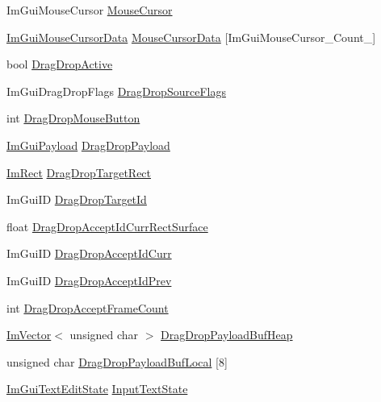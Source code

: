 \begin{DoxyCompactItemize}
Im\+Gui\+Mouse\+Cursor \hyperlink{struct_im_gui_context_ab60730c7f9f601fd0b22dac060a822e3}{Mouse\+Cursor}
\item 
\hyperlink{struct_im_gui_mouse_cursor_data}{Im\+Gui\+Mouse\+Cursor\+Data} \hyperlink{struct_im_gui_context_a244c1b68fdb7da04de90d5becd5a5777}{Mouse\+Cursor\+Data} \mbox{[}Im\+Gui\+Mouse\+Cursor\+\_\+\+Count\+\_\+\mbox{]}
\item 
bool \hyperlink{struct_im_gui_context_a2de4fe755e10ccfee6b06aa84b3d9c0d}{Drag\+Drop\+Active}
\item 
Im\+Gui\+Drag\+Drop\+Flags \hyperlink{struct_im_gui_context_a61d6d8dbd670e2f4e70d50248caac012}{Drag\+Drop\+Source\+Flags}
\item 
int \hyperlink{struct_im_gui_context_a0efbd88ee7334cb922fccb1487ba496c}{Drag\+Drop\+Mouse\+Button}
\item 
\hyperlink{struct_im_gui_payload}{Im\+Gui\+Payload} \hyperlink{struct_im_gui_context_a35f39762769e30c083758c21fbde3e78}{Drag\+Drop\+Payload}
\item 
\hyperlink{struct_im_rect}{Im\+Rect} \hyperlink{struct_im_gui_context_a9c0b11750492d186c9b96b75d824e91b}{Drag\+Drop\+Target\+Rect}
\item 
Im\+Gui\+ID \hyperlink{struct_im_gui_context_af8641ca16b62736c6af16364e65666ab}{Drag\+Drop\+Target\+Id}
\item 
float \hyperlink{struct_im_gui_context_a4a3aa38a5b88e2be8fd73b29e39e3fbc}{Drag\+Drop\+Accept\+Id\+Curr\+Rect\+Surface}
\item 
Im\+Gui\+ID \hyperlink{struct_im_gui_context_af0ac51e2f6bd98443fe5f135f3e2ecac}{Drag\+Drop\+Accept\+Id\+Curr}
\item 
Im\+Gui\+ID \hyperlink{struct_im_gui_context_ab835f6cb1536a4e91b6d589a100612f9}{Drag\+Drop\+Accept\+Id\+Prev}
\item 
int \hyperlink{struct_im_gui_context_a8163ed15c1f157390a3215dcb28feb9e}{Drag\+Drop\+Accept\+Frame\+Count}
\item 
\hyperlink{class_im_vector}{Im\+Vector}$<$ unsigned char $>$ \hyperlink{struct_im_gui_context_af4797d5b38c5c659d1aa0160d46549d8}{Drag\+Drop\+Payload\+Buf\+Heap}
\item 
unsigned char \hyperlink{struct_im_gui_context_ae4f0ffccf3107a3eb4e1ba3d6258c3e4}{Drag\+Drop\+Payload\+Buf\+Local} \mbox{[}8\mbox{]}
\item 
\hyperlink{struct_im_gui_text_edit_state}{Im\+Gui\+Text\+Edit\+State} \hyperlink{struct_im_gui_context_ae8626ef18bc5a848691a0c50e2c0f7ae}{Input\+Text\+State}
\item 

\end{DoxyCompactItemize}
